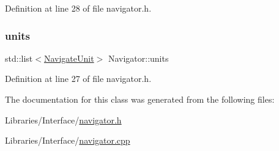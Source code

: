 Definition at line 28 of file navigator.\+h.

\mbox{\label{class_navigator_ad830f88cb2d1b38f7ff49797e244892d}} 
\subsubsection{\texorpdfstring{units}{units}}
{\footnotesize\ttfamily std\+::list$<$\mbox{\hyperlink{struct_navigate_unit}{Navigate\+Unit}}$>$ Navigator\+::units\hspace{0.3cm}{\ttfamily [private]}}



Definition at line 27 of file navigator.\+h.



The documentation for this class was generated from the following files\+:\begin{DoxyCompactItemize}
\item 
Libraries/\+Interface/\mbox{\hyperlink{navigator_8h}{navigator.\+h}}\item 
Libraries/\+Interface/\mbox{\hyperlink{navigator_8cpp}{navigator.\+cpp}}\end{DoxyCompactItemize}

